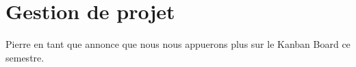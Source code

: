 \documentclass [a4paper] {article}
\begin{document}
\section{Gestion de projet}
Pierre en tant que \CP{} annonce que nous nous appuerons plus sur le Kanban Board ce semestre.



\end{document}
